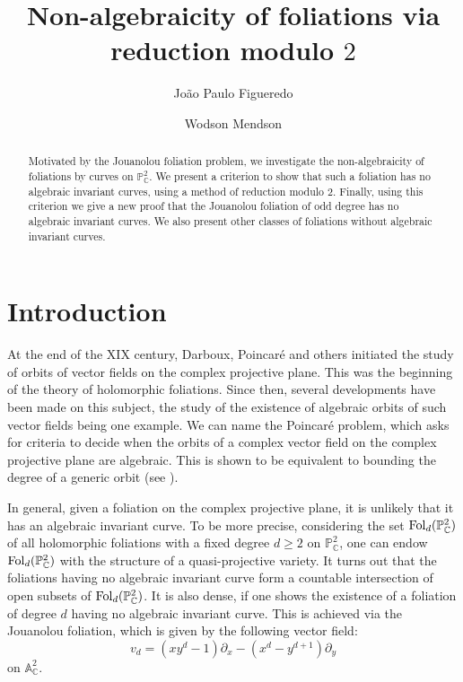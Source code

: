 \documentclass[reqno,oneside,11pt]{amsart}
\title{Non-algebraicity of foliations via reduction modulo $2$}
\author[Jo\~ao Paulo Figueredo]{Jo\~ao Paulo Figueredo}
\author[Wodson Mendson]{Wodson Mendson}
\theoremstyle{definition}
\begin{document}

\begin{abstract}  Motivated by the Jouanolou foliation problem, we investigate the non-algebraicity of foliations by curves on $\mathbb{P}^2_{\mathbb{C}}$. We present a criterion to show that such a foliation has no algebraic invariant curves, using a method of reduction modulo $2$. Finally, using this criterion we give a new proof that the Jouanolou foliation of odd degree has no algebraic invariant curves. We also present other classes of foliations without algebraic invariant curves.
\end{abstract}

\maketitle



\setcounter{tocdepth}{1}
\tableofcontents

\section{Introduction} 

At the end of the XIX century, Darboux, Poincaré and others initiated the study of orbits of vector fields on the complex projective plane. This was the beginning of the theory of holomorphic foliations. Since then, several developments have been made on this subject, the study of the existence of algebraic orbits of such vector fields being one example. We can name the Poincaré problem, which asks for criteria to decide when the orbits of a complex vector field on the complex projective plane are algebraic. This is shown to be equivalent to bounding the degree of a generic orbit (see \cite{poincareproblem}).

In general, given a foliation on the complex projective plane, it is unlikely that it has an algebraic invariant curve. To be more precise, considering the set ${\rm Fol}_d(\mathbb{P}^2_\mathbb{C})$ of all holomorphic foliations with a fixed degree $d \geq 2$ on $\mathbb{P}^2_\mathbb{C}$, one can endow ${\rm Fol}_d(\mathbb{P}^2_\mathbb{C})$ with the structure of a quasi-projective variety. It turns out that the foliations having no algebraic invariant curve form a countable intersection of open subsets of ${\rm Fol}_d(\mathbb{P}^2_\mathbb{C})$. It is also dense, if one shows the existence of a foliation of degree $d$ having no algebraic invariant curve. This is achieved via the Jouanolou foliation, which is given by the following vector field:
\[v_d = (xy^d-1)\partial_x - (x^d - y^{d+1})\partial_y\]
on $\mathbb{A}^2_\mathbb{C}$.
\end{document}
